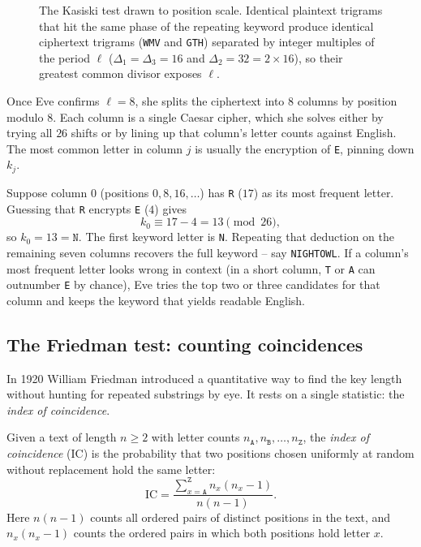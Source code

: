 \begin{figure}[htbp]
\caption{The Kasiski test drawn to position scale. Identical plaintext trigrams that hit the same phase of the repeating keyword produce identical ciphertext trigrams (\texttt{WMV} and \texttt{GTH}) separated by integer multiples of the period $\ell$ ($\Delta_1 = \Delta_3 = 16$ and $\Delta_2 = 32 = 2\times 16$), so their greatest common divisor exposes $\ell$.}
\label{ch02:fig-kasiski}
\end{figure}

Once Eve confirms $\ell = 8$, she splits the ciphertext into $8$ columns by position modulo $8$.
Each column is a single Caesar cipher, which she solves either by trying all $26$ shifts or by
lining up that column's letter counts against English. The most common letter in column $j$ is
usually the encryption of \texttt{E}, pinning down $k_j$.

\begin{example}
\label{ch02:vig-column}
Suppose column $0$ (positions $0,8,16,\ldots$) has \texttt{R} ($17$) as its most frequent
letter. Guessing that \texttt{R} encrypts \texttt{E} ($4$) gives
\[
  k_0 \equiv 17 - 4 = 13 \pmod{26},
\]
so $k_0 = 13 = \texttt{N}$. The first keyword letter is \texttt{N}. Repeating that deduction on
the remaining seven columns recovers the full keyword -- say \texttt{NIGHTOWL}. If a column's
most frequent letter looks wrong in context (in a short column, \texttt{T} or \texttt{A} can
outnumber \texttt{E} by chance), Eve tries the top two or three candidates for that column and
keeps the keyword that yields readable English.
\end{example}

\subsection{The Friedman test: counting coincidences}
\label{ch02:friedman}

In 1920 William Friedman introduced a quantitative way to find the key length without hunting
for repeated substrings by eye. It rests on a single statistic: the \emph{index of coincidence}.

\begin{definition}
\label{ch02:ioc-def}
Given a text of length $n \ge 2$ with letter counts $n_{\texttt{A}}, n_{\texttt{B}}, \ldots,
n_{\texttt{Z}}$, the \emph{index of coincidence} ($\mathrm{IC}$) is the probability that two
positions chosen uniformly at random without replacement hold the same letter:
\[
  \mathrm{IC} = \frac{\sum_{x=\texttt{A}}^{\texttt{Z}} n_x (n_x - 1)}{n(n-1)}.
\]
Here $n(n-1)$ counts all ordered pairs of distinct positions in the text, and $n_x(n_x - 1)$
counts the ordered pairs in which both positions hold letter $x$.
\end{definition}


